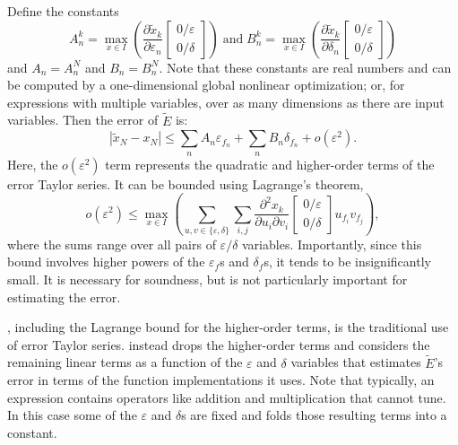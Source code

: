 \documentclass[paper.tex]{subfiles}
\begin{document}
Define the constants
\[
A^k_n = \max_{x \in I} \left( \frac{\partial \tilde{x}_k}{\partial \varepsilon_n}
\left[\begin{array}{l}0 / \varepsilon \\ 0 / \delta \end{array}\right] \right)
\;\text{and}\;
B^k_n = \max_{x \in I} \left( \frac{\partial \tilde{x}_k}{\partial \delta_n}
\left[\begin{array}{l}0 / \varepsilon \\ 0 / \delta \end{array}\right] \right)
\]
  and $A_n = A^N_n$ and $B_n = B^N_n$.
Note that these constants are real numbers
  and can be computed
  by a one-dimensional global nonlinear optimization;
  or, for expressions with multiple variables,
  over as many dimensions as there are input variables.
Then the error of $\tilde{E}$ is:
\begin{equation}\label{errmodelformal}
  |\tilde{x}_N - x_N| \le \sum_n A_n \varepsilon_{f_n} + \sum_n B_n
  \delta_{f_n} + o(\varepsilon^2).
\end{equation}
Here, the $o(\varepsilon^2)$ term represents
  the quadratic and higher-order terms
  of the error Taylor series.
It can be bounded using Lagrange's theorem,
\[
  o(\varepsilon^2) \le
  \max_{x \in I} \left(
  \sum_{u, v \in \{\varepsilon, \delta\}}
  \sum_{i,j}
  \frac{\partial^2 x_k}{\partial u_i \partial v_i}
    \left[\begin{array}{l}0 / \varepsilon \\ 0 / \delta \end{array}\right]
    u_{f_i}
    v_{f_j}
    \right),
\]
  where the sums range over all pairs of $\varepsilon/\delta$ variables.
Importantly, since this bound involves higher powers
  of the $\varepsilon_f$s and $\delta_f$s,
  it tends to be insignificantly small.
It is necessary for soundness,
  but is not particularly important for estimating the error.

,
  including the Lagrange bound for the higher-order terms,
  is the traditional use of error Taylor series.
\name instead drops the higher-order terms
  and considers the remaining linear terms as
  a function of the $\varepsilon$ and $\delta$ variables
  that estimates $\tilde{E}$'s error
  in terms of the function implementations it uses.
Note that typically, an expression contains operators
  like addition and multiplication that \name cannot tune.
In this case
  some of the $\varepsilon$ and $\delta$s are fixed
  and \name folds those resulting terms into a constant.
\end{document}
